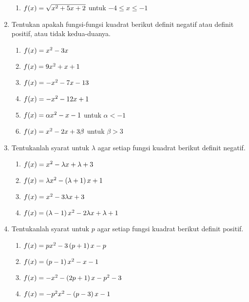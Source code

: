 \begin{enumerate}[topsep=0pt]
\begin{enumerate}
				\item $ \mathop{}\!{f}{\left({x}\right)} = \sqrt{x^{2} + 5x + 2} $ untuk $ -4 \leq x \leq -1 $
			\end{enumerate}
			\item Tentukan apakah fungsi-fungsi kuadrat berikut definit negatif atau definit positif, atau tidak kedua-duanya.
			\begin{enumerate}
				\item $ \mathop{}\!{f}{\left({x}\right)} = x^{2} - 3x $
				\item $ \mathop{}\!{f}{\left({x}\right)} = 9x^{2} + x + 1 $
				\item $ \mathop{}\!{f}{\left({x}\right)} = -x^{2} - 7x - 13 $
				\item $ \mathop{}\!{f}{\left({x}\right)} = -x^{2} - 12x + 1 $
				\item $ \mathop{}\!{f}{\left({x}\right)} = \alpha x^{2} - x - 1 $ untuk $ \alpha < -1 $
				\item $ \mathop{}\!{f}{\left({x}\right)} = x^{2} - 2x + 3\beta $ untuk $ \beta > 3 $
			\end{enumerate}
			\item Tentukanlah syarat untuk $ \lambda $ agar setiap fungsi kuadrat berikut definit negatif.
			\begin{multcols}
				\begin{enumerate}
					\item $ \mathop{}\!{f}{\left({x}\right)} = x^{2} - \lambda x + \lambda + 3 $
					\item $ \mathop{}\!{f}{\left({x}\right)} = \lambda x^{2} - \left(\lambda + 1\right)x + 1 $
					\item $ \mathop{}\!{f}{\left({x}\right)} = x^{2} - 3\lambda x + 3 $
					\item $ \mathop{}\!{f}{\left({x}\right)} = \left(\lambda - 1\right)x^{2} - 2\lambda x + \lambda + 1 $
				\end{enumerate}
			\end{multcols}
			\item Tentukanlah syarat untuk $ p $ agar setiap fungsi kuadrat berikut definit positif.
			\begin{multcols}
				\begin{enumerate}
					\item $ \mathop{}\!{f}{\left({x}\right)} = px^{2} - 3\left(p + 1\right)x - p $
					\item $ \mathop{}\!{f}{\left({x}\right)} = \left(p - 1\right)x^{2} - x - 1 $
					\item $ \mathop{}\!{f}{\left({x}\right)} = -x^{2} -\left(2p + 1\right)x - p^{2} - 3 $
					\item $ \mathop{}\!{f}{\left({x}\right)} = -p^{2}x^{2} - \left(p - 3\right)x - 1 $
				\end{enumerate}
			\end{multcols}

\end{enumerate}
